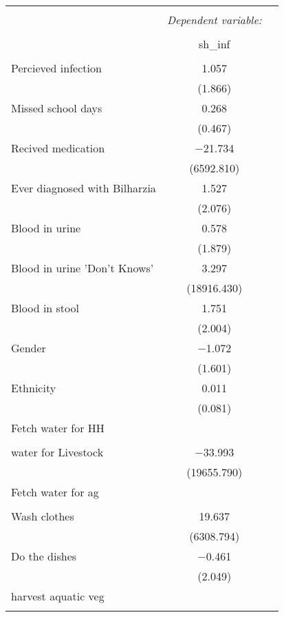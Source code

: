 


\begin{longtable}{@{\extracolsep{5pt}}lcc} 
  \caption{} 
\\[-1.8ex]\hline 
\hline \\[-1.8ex] 
 & \multicolumn{1}{c}{\textit{Dependent variable:}} \\ 
\cline{2-3} 
\\[-1.8ex] & sh\_inf \\ 
\hline \\[-1.8ex] 
 Percieved infection & 1.057 \\ 
  & (1.866) \\ 
  Missed school days & 0.268 \\ 
  & (0.467) \\ 
  Recived medication & $-$21.734 \\ 
  & (6592.810) \\ 
  Ever diagnosed with Bilharzia & 1.527 \\ 
  & (2.076) \\ 
  Blood in urine & 0.578 \\ 
  & (1.879) \\ 
  Blood in urine 'Don't Knows' & 3.297 \\ 
  & (18916.430) \\ 
  Blood in stool & 1.751 \\ 
  & (2.004) \\ 
  Gender & $-$1.072 \\ 
  & (1.601) \\ 
  Ethnicity & 0.011 \\ 
  & (0.081) \\ 
  Fetch water for HH &  \\ 
  &  \\ 
  water for Livestock & $-$33.993 \\ 
  & (19655.790) \\ 
  Fetch water for ag &  \\ 
  &  \\ 
  Wash clothes & 19.637 \\ 
  & (6308.794) \\ 
  Do the dishes & $-$0.461 \\ 
  & (2.049) \\ 
  harvest aquatic veg &  \\ 
  &  \\ 

\end{longtable}
